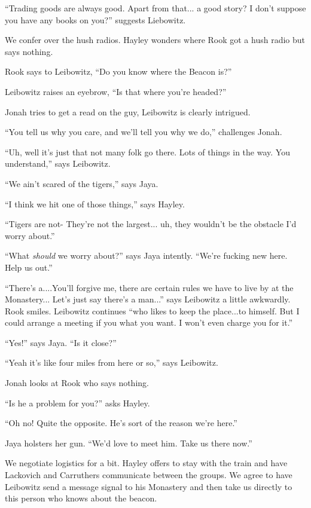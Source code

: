 ``Trading goods are always good.  Apart from that... a good story?  I don't suppose you have any books on you?'' suggests Liebowitz.

We confer over the hush radios.  Hayley wonders where Rook got a hush radio but says nothing.



Rook says to Leibowitz, ``Do you know where the Beacon is?''

Leibowitz raises an eyebrow, ``Is that where you're headed?''

Jonah tries to get a read on the guy, Leibowitz is clearly intrigued.

``You tell us why you care, and we'll tell you why we do,'' challenges Jonah.

``Uh, well it's just that not many folk go there.  Lots of things in the way.  You understand,'' says Leibowitz.

``We ain't scared of the tigers,'' says Jaya.

``I think we hit one of those things,'' says Hayley.

``Tigers are not-  They're not the largest... uh, they wouldn't be the obstacle I'd worry about.''

``What \textit{should }we worry about?'' says Jaya intently.  ``We're fucking new here.  Help us out.''

``There's a....You'll forgive me, there are certain rules we have to live by at the Monastery...  Let's just say there's a man...'' says Leibowitz a little awkwardly.  Rook smiles.  Leibowitz continues ``who likes to keep the place...to himself.  But I could arrange a meeting if you what you want.  I won't even charge you for it.''

``Yes!'' says Jaya.  ``Is it close?''

``Yeah it's like four miles from here or so,'' says Leibowitz.

Jonah looks at Rook who says nothing.

``Is he a problem for you?'' asks Hayley.

``Oh no!  Quite the opposite.  He's sort of the reason we're here.''

Jaya holsters her gun.  ``We'd love to meet him.  Take us there now.''

We negotiate logistics for a bit.  Hayley offers to stay with the train and have Lackovich and Carruthers communicate between the groups.  We agree to have Leibowitz send a message signal to his Monastery and then take us directly to this person who knows about the beacon.

